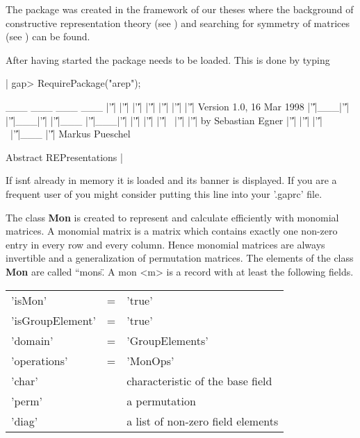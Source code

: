 The package {\AREP} was created in the framework of our theses where
the background of constructive representation theory (see
\cite{Pue98}) and searching for symmetry of matrices (see
\cite{Egn97}) can be found.


After having started {\GAP} the {\AREP} package needs to be 
loaded. This is done by typing\:

\renewcommand{\baselinestretch}{0.8}
|    gap> RequirePackage("arep");

                 ___   ___   ___  ___   
                |'\|'|   |'\|'| |'\|'|   |'\|'| |'\|'|    |'\|'|   |'\|'|   Version 1.0, 16 Mar 1998
                |'\|'|___|'\|'| |'\|'|___|'\|'| |'\|'|___ |'\|'|___|'\|'|
                |'\|'|   |'\|'| |'\|'|  \  |'\|'|    |'\|'|       by Sebastian Egner
                |'\|'|   |'\|'| |'\|'|   \ |'\|'|___ |'\|'|          Markus Pueschel

               Abstract REPresentations |

\renewcommand{\baselinestretch}{1}

%
%

If {\AREP} isn\'t already in memory it is loaded and its 
banner is displayed. If you are a frequent user of {\AREP} 
you might consider putting this line into your '.gaprc' file.

The class {\bf Mon} is created to represent and calculate
efficiently with monomial matrices. A monomial matrix is a
matrix which contains exactly one non-zero entry in every
row and every column. Hence monomial matrices are always invertible 
and a generalization of permutation matrices. The elements
of the class {\bf Mon} are called ``mons\". A mon <m> is a 
record with at least the following fields.

\begin{center}
\begin{tabular}{lll}
'isMon'          & \:= & 'true'\\
'isGroupElement' & \:= & 'true'\\
'domain'         & \:= & 'GroupElements'\\
'operations'     & \:= & 'MonOps'\\
'char'           & \: & characteristic of the base field\\
'perm'           & \: & a permutation\\
'diag'           & \: & a list of non-zero field elements
\end{tabular}    
\end{center}

